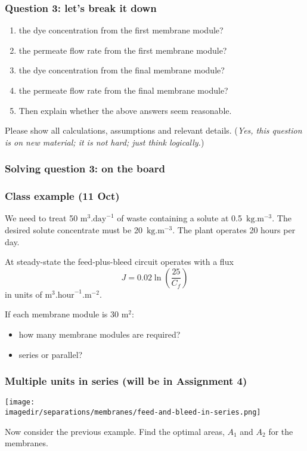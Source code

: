 \begin{frame}\frametitle{Question 3: let's break it down}
	\begin{enumerate}
		\item	the dye concentration from the first membrane module?
		\item	the permeate flow rate from the first membrane module?
		\item	the dye concentration from the final membrane module?
		\item	the permeate flow rate from the final membrane module?
		\item	Then explain whether the above answers seem reasonable.
	\end{enumerate}
	Please show all calculations, assumptions and relevant details. (\emph{Yes, this question is on new material; it is not hard; just think logically.})
\end{frame}

\begin{frame}\frametitle{Solving question 3: on the board}
	
\end{frame}

\begin{frame}\frametitle{Class example (11 Oct)}
	We need to treat 50 $\text{m}^3\text{.day}^{-1}$ of waste containing a solute at 0.5~$\text{kg}\text{.m}^{-3}$. The desired solute concentrate must be 20~$\text{kg}\text{.m}^{-3}$. The plant operates 20 hours per day.
	
	\vspace{12pt}
	At steady-state the feed-plus-bleed circuit operates with a flux 
	\[
		J = 0.02 \ln \left(\frac{25}{C_f} \right)
	\]
	in units of $\text{m}^3.\text{hour}^{-1}.\text{m}^{-2}$.
	
	\vspace{12pt}
	If each membrane module is 30 m$^2$:	
	\begin{itemize}
		\item	how many membrane modules are required?
		\item	series or parallel?
	\end{itemize}
\end{frame}

\begin{frame}\frametitle{Multiple units in series (will be in Assignment 4)}
	\begin{center}
		\texttt{[image: \\imagedir/separations/membranes/feed-and-bleed-in-series.png]}
	\end{center}
	
	Now consider the previous example. Find the optimal areas, $A_1$ and $A_2$ for the membranes.	
\end{frame}

